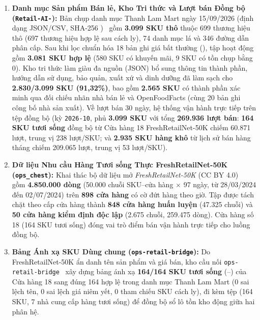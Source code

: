 \begin{enumerate}
    \item \textbf{Danh mục Sản phẩm Bán lẻ, Kho Tri thức và Lượt bán Đồng bộ (\texttt{Retail-AI-}):} Bản chụp danh mục Thanh Lam Mart ngày 15/09/2026 (định dạng JSON/CSV, SHA-256 )~\cite{thanh_lam_catalog} gồm \textbf{3.099 SKU thô} thuộc 699 thương hiệu thô (697 thương hiệu hợp lệ sau cách ly), 74 danh mục lá và 346 đường dẫn phân cấp. Sau khi lọc chuẩn hóa 18 bản ghi giá bất thường (), tập hoạt động gồm \textbf{3.081 SKU hợp lệ} (580 SKU có khuyến mãi, 9 SKU có tồn chụp bằng 0). Kho tri thức làm giàu đa nguồn (JSON) bổ sung thông tin thành phần, hướng dẫn sử dụng, bảo quản, xuất xứ và dinh dưỡng đã làm sạch cho \textbf{2.830/3.099 SKU (91,32\%)}, bao gồm \textbf{2.565 SKU} có thành phần xác minh qua đối chiếu nhãn nhà bán lẻ và OpenFoodFacts (cùng 20 bản ghi công bố nhà sản xuất). Về lượt bán 30 ngày, hệ thống vận hành trực tiếp trên tệp đồng bộ  (kỳ \texttt{2026-10}, phủ \textbf{3.099 SKU} với tổng \textbf{269.936 lượt bán}: \textbf{164 SKU tươi sống} đồng bộ từ Cửa hàng 18 FreshRetailNet-50K chiếm 60.871 lượt, trung vị 238 lượt/SKU; và \textbf{2.935 SKU hàng khô} từ lịch sử bán hàng tháng chiếm 209.065 lượt, trung vị 53 lượt/SKU).
    \item \textbf{Dữ liệu Nhu cầu Hàng Tươi sống Thực FreshRetailNet-50K (\texttt{ops\_chest}):} Khai thác bộ dữ liệu mở \emph{FreshRetailNet-50K} (CC BY 4.0)~\cite{freshretailnet50k} gồm \textbf{4.850.000 dòng} (50.000 chuỗi SKU--cửa hàng $\times$ 97 ngày, từ 28/03/2024 đến 02/07/2024) trên \textbf{898 cửa hàng} có cờ đứt hàng theo giờ. Tập được tách chặt theo cấp cửa hàng thành \textbf{848 cửa hàng huấn luyện} (47.325 chuỗi) và \textbf{50 cửa hàng kiểm định độc lập} (2.675 chuỗi, 259.475 dòng). Cửa hàng số 18 (164 SKU tươi sống) đóng vai trò điểm bán vận hành trực tiếp cho luồng đồng bộ.
    \item \textbf{Bảng Ánh xạ SKU Dùng chung (\texttt{ops-retail-bridge}):} Do FreshRetailNet-50K ẩn danh tên sản phẩm và giá bán, kho cầu nối \texttt{ops-retail-bridge}~\cite{ops_retail_bridge_repo} xây dựng bảng  ánh xạ \textbf{164/164 SKU tươi sống} (--) của Cửa hàng 18 sang đúng 164  hợp lệ trong danh mục Thanh Lam Mart (0 sai lệch tên, 0 sai lệch giá niêm yết, 0 tham chiếu SKU cách ly), đi kèm tệp  (164 SKU, 7 nhà cung cấp hàng tươi sống) để đồng bộ sổ lô tồn kho động giữa hai phân hệ.
\end{enumerate}

